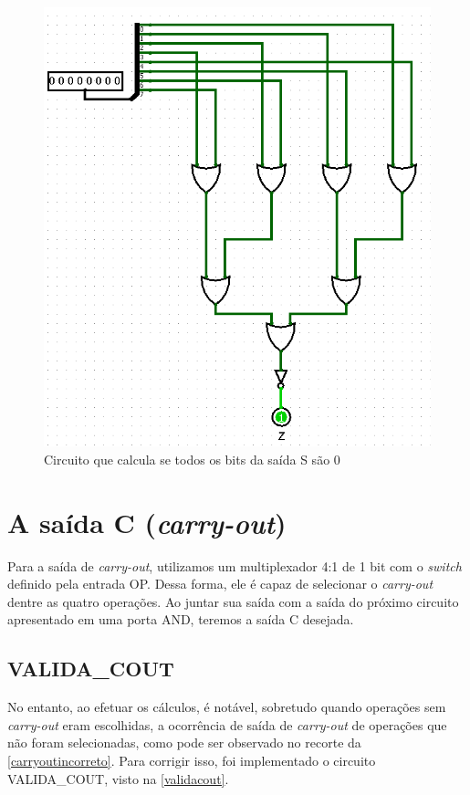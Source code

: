 \documentclass[
	12pt,				%
	openright,			%
	twoside,			%
	a4paper,			%
	english,			%
	french,				%
	spanish,			%
	brazil,				%
	]{abntex2}
\begin{document}
\begin{figure}[H]
	\begin{center}
	    \includegraphics[scale=0.5]{ZERO.png}
	\end{center}
\caption{\label{saidaZ}Circuito que calcula se todos os bits da saída S são 0}
\end{figure}

\section{A saída C (\textit{carry-out})}

Para a saída de \textit{carry-out}, utilizamos um multiplexador 4:1 de 1 bit com o \textit{switch} definido pela entrada OP. Dessa forma, ele é capaz de selecionar o \textit{carry-out} dentre as quatro operações. Ao juntar sua saída com a saída do próximo circuito apresentado em uma porta AND, teremos a saída C desejada.

\subsection{VALIDA\_COUT}

No entanto, ao efetuar os cálculos, é notável, sobretudo quando operações sem \textit{carry-out} eram escolhidas, a ocorrência de saída de \textit{carry-out} de operações que não foram selecionadas, como pode ser observado no recorte da \autoref{carryoutincorreto}. Para corrigir isso, foi implementado o circuito VALIDA\_COUT, visto na \autoref{validacout}.
\end{document}

